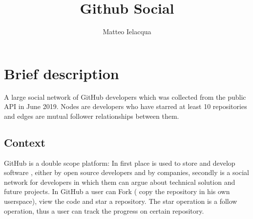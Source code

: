 \documentclass[]{article}
\begin{document}
\author{Matteo Ielacqua}
\title{Github Social}
\maketitle
    \section{Brief description}
    A large social network of GitHub developers which was collected from the public API in June 2019. Nodes are developers who have starred at least 10 repositories and edges are mutual follower relationships between them.
    \subsection*{Context}
    GitHub is a double scope platform: In first place is used to store and develop software , either by open source developers and by companies, secondly is a social network for developers in which them can argue about technical solution and future projects. In GitHub a user can Fork ( copy the repository in his own userspace), view the code and star a repository. The star operation is a follow operation, thus a user can track the progress on certain repository. 
    
\end{document}
